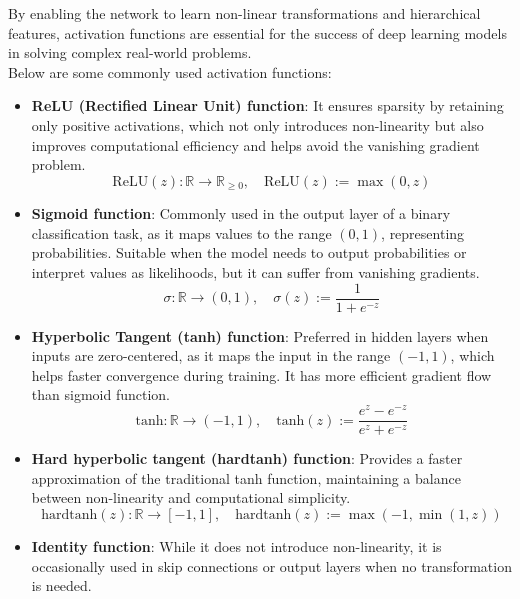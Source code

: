 By enabling the network to learn non-linear transformations and hierarchical features, activation functions are essential for the success of deep learning models in solving complex real-world problems.\\

Below are some commonly used activation functions:
\begin{itemize}
    \item \textbf{ReLU (Rectified Linear Unit) function}: It ensures sparsity by retaining only positive activations, which not only introduces non-linearity but also improves computational efficiency and helps avoid the vanishing gradient problem.\cite{nair2010relu}
    \begin{equation}
        \text{ReLU}(z): \mathbb{R} \to \mathbb{R}_{\geq 0}, \quad \text{ReLU}(z) := \max(0, z)
        \label{eqn:5}
    \end{equation}
    \item \textbf{Sigmoid function}: Commonly used in the output layer of a binary classification task, as it maps values to the range $(0, 1)$, representing probabilities. Suitable when the model needs to output probabilities or interpret values as likelihoods, but it can suffer from vanishing gradients.\cite{hochreiter1997lstm}\cite{rumelhart1986learning}
    \begin{equation}
        \sigma: \mathbb{R} \to (0,1), \quad \sigma(z) := \frac{1}{1+e^{-z}}
        \label{eqn:6}
    \end{equation}
    \item \textbf{Hyperbolic Tangent (tanh) function}: Preferred in hidden layers when inputs are zero-centered, as it maps the input in the range $(-1, 1)$, which helps faster convergence during training. It has more efficient gradient flow than sigmoid function.
    \begin{equation}
        \text{tanh}: \mathbb{R} \to (-1,1), \quad \text{tanh}(z) := \frac{e^z-e^{-z}}{e^z+e^{-z}}
        \label{eqn:7}
    \end{equation}
    \item \textbf{Hard hyperbolic tangent (hardtanh) function}: Provides a faster approximation of the traditional tanh function, maintaining a balance between non-linearity and computational simplicity.
    \begin{equation}
        \text{hardtanh}(z): \mathbb{R} \to [-1,1], \quad \text{hardtanh}(z) := \max(-1, \min(1,z))
        \label{eqn:8}
    \end{equation}
    \item \textbf{Identity function}: While it does not introduce non-linearity, it is occasionally used in skip connections or output layers when no transformation is needed.

\end{itemize}
